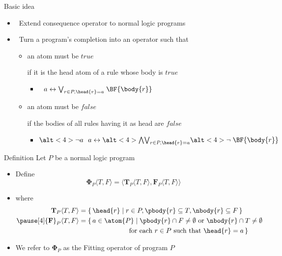 \begin{frame}{Basic idea}
  \bigskip
  \begin{itemize}
  \item {} \ Extend consequence operator to normal logic programs
    \medskip
  \item {} \
    Turn a program's completion into an operator such that
    \smallskip
    \begin{itemize}\normalsize
    \item an atom must be $\mathit{true}$
      \par\smallskip
      if it is the head atom of a rule whose body is $\mathit{true}$
      \smallskip
      \begin{itemize}\normalsize
      \item<only@2->
        \(
        \phantom{\neg}a
        \leftrightarrow
        \textstyle{\bigvee_{r\in P, \head{r} = a}}\; \BF{\body{r}}
        \)
      \end{itemize}
    \smallskip
    \item an atom must be $\mathit{false}$
      \par\smallskip
      if the bodies of all rules having it as head are $\mathit{false}$
      \smallskip
      \begin{itemize}\normalsize
      \item<only@3->
        \(
        \alt<4>{\neg a}{\phantom{\neg}a}
        \leftrightarrow
        \textstyle{\alt<4>{\bigwedge}{\bigvee}_{r\in P, \head{r} = a}}\alt<4>{\neg}{\;} \BF{\body{r}}
        \)
      \end{itemize}
    \end{itemize}
  \end{itemize}
  \nocite{fitting02a}
\end{frame}
\begin{frame}{Definition}
  \medskip
  Let $P$ be a normal logic program
  \medskip
  \begin{itemize}
  \item<2-> Define
    \[
      {\mathbf{\Phi}}_P\langle T,F \rangle
      =
      \langle
      {\mathbf{T}}_P\langle T,F \rangle,
      {\mathbf{F}}_P\langle T,F \rangle
      \rangle
    \]
  \item<3-> []
    where
    \begin{align*}
      {\mathbf{T}}_P\langle T,F \rangle
      & =
      \{\, \head{r} \mid r \in P, \pbody{r} \subseteq T, \nbody{r} \subseteq F \,\}
      \\\pause[4]
      {\mathbf{F}}_P\langle T,F \rangle
      & =
      \{\, a \in \atom{P} \mid
      \pbody{r} \cap F \neq \emptyset
      \text{ or }
      \nbody{r} \cap T \neq \emptyset
      \\
      & \kern 71pt
      \text{ for each } r \in P
      \text{ such that }
      \head{r} = a
      \,\}
    \end{align*}
  \item<5-> We refer to ${\mathbf{\Phi}}_P$ as the \alert{Fitting operator} of program $P$
  \end{itemize}
\end{frame}

